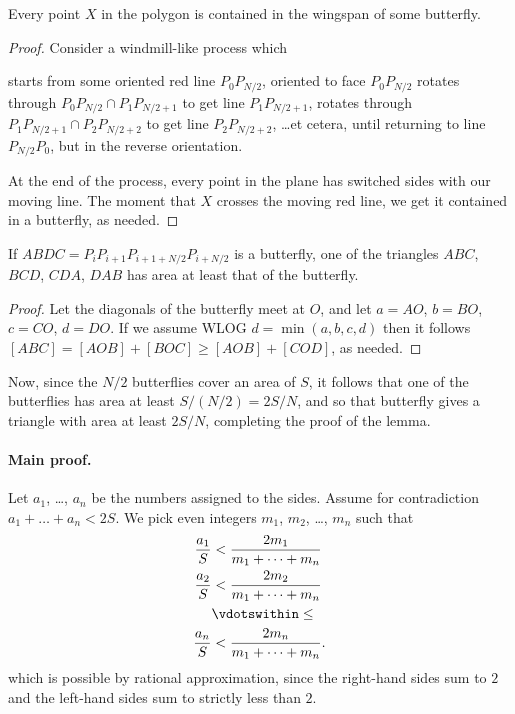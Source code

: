 \begin{claim*}
  Every point $X$ in the polygon is contained in the wingspan of some butterfly.
\end{claim*}
\begin{proof}
  Consider a windmill-like process which
  \begin{itemize}
    \ii starts from some oriented red line $P_0 P_{N/2}$, oriented to face $P_0 P_{N/2}$
    \ii rotates through $P_0 P_{N/2} \cap P_1 P_{N/2+1}$ to get line $P_1 P_{N/2+1}$,
    \ii rotates through $P_1 P_{N/2+1} \cap P_2 P_{N/2+2}$ to get line $P_2 P_{N/2+2}$,
    \ii \dots et cetera, until returning to line $P_{N/2} P_0$,
    but in the reverse orientation.
  \end{itemize}
  At the end of the process, every point in the plane has switched sides with our moving line.
  The moment that $X$ crosses the moving red line, we get it contained in a butterfly, as needed.
\end{proof}

\begin{claim*}
  If $ABDC = P_i P_{i+1} P_{i+1+N/2} P_{i+N/2}$ is a butterfly,
  one of the triangles $ABC$, $BCD$, $CDA$, $DAB$
  has area at least that of the butterfly.
\end{claim*}
\begin{proof}
  Let the diagonals of the butterfly meet at $O$,
  and let $a = AO$, $b = BO$, $c = CO$, $d = DO$.
  If we assume WLOG $d = \min(a,b,c,d)$
  then it follows $[ABC] = [AOB] + [BOC] \ge [AOB] + [COD]$, as needed.
\end{proof}

Now, since the $N/2$ butterflies cover an area of $S$,
it follows that one of the butterflies
has area at least $S / (N/2) = 2S/N$,
and so that butterfly gives a triangle with area at least $2S/N$,
completing the proof of the lemma.

\paragraph{Main proof.}
Let $a_1$, \dots, $a_n$ be the numbers assigned to the sides.
Assume for contradiction $a_1 + \dots + a_n < 2S$.
We pick even integers $m_1$, $m_2$, \dots, $m_n$ such that
\begin{align*}
  \frac{a_1}{S} &< \frac{2m_1}{m_1 + \dots + m_n} \\
  \frac{a_2}{S} &< \frac{2m_2}{m_1 + \dots + m_n} \\
  &\vdotswithin\le \\
  \frac{a_n}{S} &< \frac{2m_n}{m_1 + \dots + m_n}.
\end{align*}
which is possible by rational approximation,
since the right-hand sides sum to $2$ and the left-hand sides sum to strictly less than $2$.

